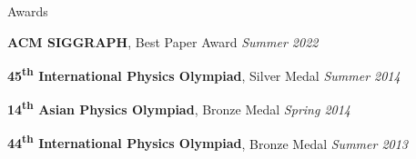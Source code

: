 \documentclass{resume}
\begin{document}

\begin{area}{Awards}
    \item \textbf{ACM SIGGRAPH}, Best Paper Award \hfill \emph{Summer 2022}
    \item \textbf{45\textsuperscript{th} International Physics Olympiad}, Silver Medal \hfill \emph{Summer 2014}
    \item \textbf{14\textsuperscript{th} Asian Physics Olympiad}, Bronze Medal \hfill \emph{Spring 2014}
    \item \textbf{44\textsuperscript{th} International Physics Olympiad}, Bronze Medal \hfill \emph{Summer 2013}
\end{area}
\end{document}
